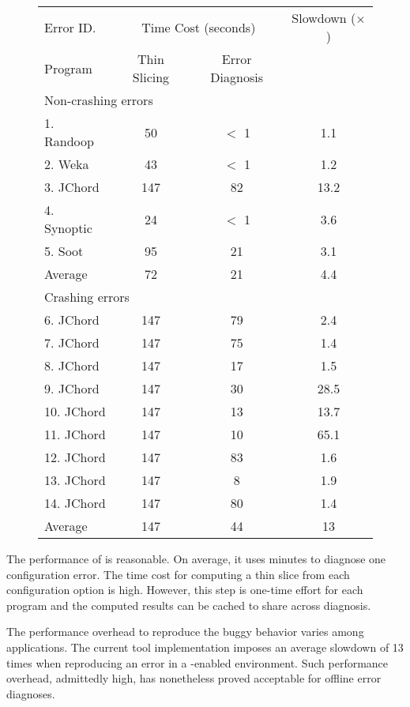 \begin{figure}[t]
\setlength{\tabcolsep}{.94\tabcolsep}
\small{
\begin{tabular}{|l|c|c|c|}
\hline
 Error ID. & \multicolumn{2}{|c|}{Time Cost (seconds)} & Slowdown ($\times$)\\
\cline{2-3}
 Program & Thin Slicing & Error Diagnosis &  \\
 \hline
\hline
\multicolumn{4}{|l|}{Non-crashing errors}   \\
 \hline
 1. Randoop & 50 & $<$ 1 & 1.1\\
 2. Weka & 43 & $<$ 1 & 1.2 \\
 3. JChord & 147 & 82 & 13.2\\
 4. Synoptic & 24 & $<$ 1 & 3.6 \\
 5. Soot & 95 & 21 & 3.1 \\
\hline
Average & 72 & 21 & 4.4\\
\hline
\hline
\multicolumn{4}{|l|}{Crashing errors}   \\
\hline
 6. JChord & 147 & 79 & 2.4\\
 7. JChord & 147 & 75 & 1.4\\
 8. JChord & 147 & 17 &1.5\\
 9. JChord & 147 & 30 & 28.5\\
 10. JChord & 147 & 13 &13.7\\
 11. JChord & 147 & 10 &65.1 \\
 12. JChord & 147 & 83 &1.6\\
 13. JChord & 147 & 8 &1.9\\
 14. JChord & 147 & 80 &1.4\\
\hline
Average & 147 & 44 & 13\\
\hline
\end{tabular}
}
\end{figure}

The performance of \ourtool is reasonable.
On average, it uses \avgtime minutes to
diagnose one configuration error. The time cost for
computing a thin slice from each configuration option
is high. However, this step is one-time effort
for each program and the computed results can be cached
to share across diagnosis. %

The performance overhead to reproduce the buggy behavior varies
among applications. The current tool implementation
imposes an average slowdown of 13 times when reproducing
an error in a \ourtool-enabled environment.
Such performance overhead, admittedly high, has nonetheless proved acceptable
for offline error diagnoses.

